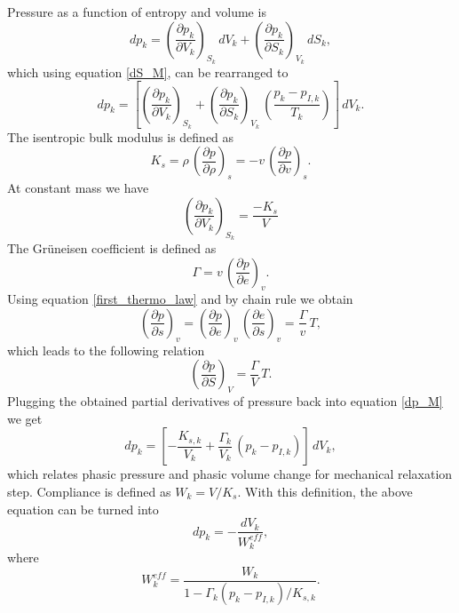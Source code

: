 Pressure as a function of entropy and volume is
\begin{equation}
dp_k=\left( \frac{\partial p_k}{\partial V_k} \right)_{S_k}\,dV_k + \left( \frac{\partial p_k}{\partial S_k} \right)_{V_k}\,dS_k,
\end{equation}
which using equation \eqref{dS_M}, can be rearranged to
\begin{equation}\label{dp_M}
dp_k=\left[ \left( \frac{\partial p_k}{\partial V_k} \right)_{S_k} + \left( \frac{\partial p_k}{\partial S_k} \right)_{V_k} \, \left( \frac{p_k-p_{I,k}}{T_k} \right) \right]\,dV_k.
\end{equation}
The isentropic bulk modulus is defined as
\begin{equation}
K_s=\rho\,\left(\frac{\partial p}{\partial \rho}\right)_s = -v\,\left(\frac{\partial p}{\partial v}\right)_s.
\end{equation}
At constant mass we have
\begin{equation}
\left( \frac{\partial p_k}{\partial V_k} \right)_{S_k} = \frac{-K_s}{V}
\end{equation}
The Gr\"uneisen coefficient is defined as
\begin{equation}
\Gamma = v\,\left( \frac{\partial p}{\partial e} \right)_{v}.
\end{equation}
Using equation \eqref{first_thermo_law} and by chain rule we obtain
\begin{equation}\label{dp_ds_v}
\left( \frac{\partial p}{\partial s} \right)_{v} = \left( \frac{\partial p}{\partial e} \right)_{v} \, \left( \frac{\partial e}{\partial s} \right)_{v} = \frac{\Gamma}{v}\,T,
\end{equation}
which leads to the following relation
\begin{equation}
\left( \frac{\partial p}{\partial S} \right)_{V} = \frac{\Gamma}{V}\,T.
\end{equation}
Plugging the obtained partial derivatives of pressure back into equation \eqref{dp_M} we get
\begin{equation}\label{dp_M_Ks}
dp_k=\left[ -\frac{K_{s,k}}{V_k} + \frac{\Gamma_k}{V_k} \, \left( p_k-p_{I,k} \right) \right]\,dV_k,
\end{equation}
which relates phasic pressure and phasic volume change for mechanical relaxation step. Compliance is defined as $W_k=V/K_s$. With this definition, the above equation can be turned into
\begin{equation}\label{dp_W}
dp_k=-\frac{dV_k}{W_k^{eff}},
\end{equation}
where
\begin{equation}
W_k^{eff} = \frac{W_k}{1-\Gamma_k \left( p_k-p_{I,k} \right)/K_{s,k}}.
\end{equation}

